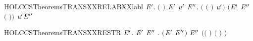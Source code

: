 \begin{SaveVerbatim}{HOLCCSTheoremsTRANSXXRELABXXlabl}
\HOLTokenTurnstile{} \HOLSymConst{\HOLTokenForall{}}   \ensuremath{\HOLBoundVar{E}\sp{\prime}}.
         \ensuremath{(} \ensuremath{)} \HOLTokenTransBegin{}\HOLTokenTransEnd \ensuremath{\HOLBoundVar{E}\sp{\prime}} \HOLSymConst{\HOLTokenImp{}}
       \HOLSymConst{\HOLTokenExists{}}\ensuremath{\HOLBoundVar{u}\sp{\prime}} \ensuremath{\HOLBoundVar{E}\sp{\prime\prime}}.
           \ensuremath{(} \HOLSymConst{\ensuremath{=}}  \ensuremath{(} \ensuremath{)} \ensuremath{\HOLBoundVar{u}\sp{\prime}}\ensuremath{)} \HOLSymConst{\HOLTokenConj{}}
           \ensuremath{(}\ensuremath{\HOLBoundVar{E}\sp{\prime}} \HOLSymConst{\ensuremath{=}}  \ensuremath{\HOLBoundVar{E}\sp{\prime\prime}} \ensuremath{(} \ensuremath{)}\ensuremath{)} \HOLSymConst{\HOLTokenConj{}}  \HOLTokenTransBegin\ensuremath{\HOLBoundVar{u}\sp{\prime}}\HOLTokenTransEnd \ensuremath{\HOLBoundVar{E}\sp{\prime\prime}}
\end{SaveVerbatim}
\newcommand{\HOLCCSTheoremsTRANSXXRELABXXlabl}{\UseVerbatim{HOLCCSTheoremsTRANSXXRELABXXlabl}}
\begin{SaveVerbatim}{HOLCCSTheoremsTRANSXXRESTR}
\HOLTokenTurnstile{} \HOLSymConst{\HOLTokenForall{}}   \ensuremath{\HOLBoundVar{E}\sp{\prime}}.
          \HOLTokenTransBegin{}\HOLTokenTransEnd \ensuremath{\HOLBoundVar{E}\sp{\prime}} \HOLSymConst{\HOLTokenImp{}}
       \HOLSymConst{\HOLTokenExists{}}\ensuremath{\HOLBoundVar{E}\sp{\prime\prime}} .
           \ensuremath{(}\ensuremath{\HOLBoundVar{E}\sp{\prime}} \HOLSymConst{\ensuremath{=}}   \ensuremath{\HOLBoundVar{E}\sp{\prime\prime}}\ensuremath{)} \HOLSymConst{\HOLTokenConj{}}  \HOLTokenTransBegin{}\HOLTokenTransEnd \ensuremath{\HOLBoundVar{E}\sp{\prime\prime}} \HOLSymConst{\HOLTokenConj{}}
           \ensuremath{(}\ensuremath{(} \HOLSymConst{\ensuremath{=}} \HOLConst{\ensuremath{\tau}}\ensuremath{)} \HOLSymConst{\HOLTokenDisj{}} \ensuremath{(} \HOLSymConst{\ensuremath{=}}  \ensuremath{)} \HOLSymConst{\HOLTokenConj{}}  \HOLConst{\HOLTokenNotIn{}}  \HOLSymConst{\HOLTokenConj{}}   \HOLConst{\HOLTokenNotIn{}} \ensuremath{)}
\end{SaveVerbatim}

